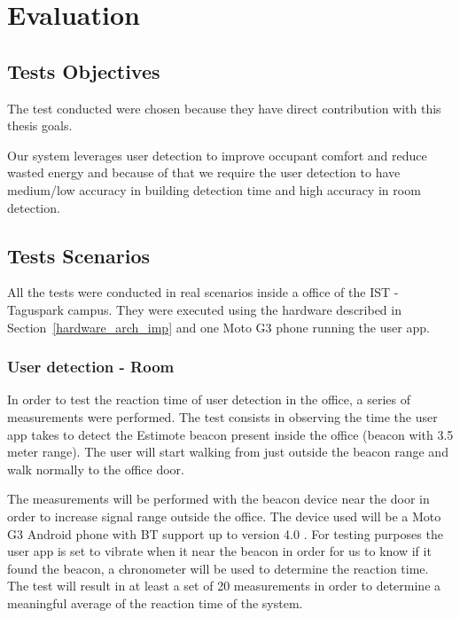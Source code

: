\chapter{Evaluation}
\label{chapter:evaluation}

\section{Tests Objectives}

The test conducted were chosen because they have direct contribution with this thesis goals.

Our system leverages user detection to improve occupant comfort and reduce wasted energy and because of that we require the user detection to have medium/low accuracy in building detection time and high accuracy in room detection.




\section{Tests Scenarios}



All the tests were conducted in real scenarios inside a office of the IST - Taguspark campus. They
were executed using the hardware described in Section~\ref{hardware_arch_imp} and one Moto G3 phone running the user app.


\subsection{User detection - Room}


In order to test the reaction time of user detection in the office, a series of measurements were performed. The test consists in observing the time the user app takes to detect the Estimote beacon present inside the office (beacon with 3.5 meter range). The user will start walking from just outside the beacon range and walk normally to the office door.

The measurements will be performed with the beacon device near the door in order to increase signal range outside the office. The device used will be a Moto G3 Android phone with BT support up to version 4.0 .
For testing purposes the user app is set to vibrate when it near the beacon in order for us to know if it found the beacon, a chronometer will be used to determine the reaction time. The test will result in at least a set of 20 measurements in order to determine a meaningful average of the reaction time of the system.


